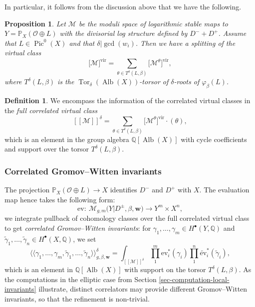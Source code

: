 \documentclass[11pt]{article}
\numberwithin{equation}{section}
\newcommand{\vir}[1]{\big[#1\big]^\mathrm{vir}}
\newcommand{\fvir}[2]{[\![ #1 ]\!]^{#2}}
\newcommand{\ev}{\mathrm{ev}}
\newcommand{\Pic}{\operatorname{Pic}}
\newcommand{\Alb}{\operatorname{Alb}}
\newcommand{\PP}{\mathbb{P}}
\newcommand{\QQ}{\mathbb{Q}}
\newcommand{\bfw}{ {\boldsymbol w} }
\newcommand{\M}{\mathcal{M}}
\renewcommand{\O}{\mathcal{O}}
\numberwithin{equation}{section}
\newtheorem{prop}[theo]{Proposition}
\theoremstyle{definition}
\newtheorem{defi}[theo]{Definition}
\begin{document}
In particular, it follows from the discussion above that we have the following.
\begin{prop}
 Let $\M$ be the moduli space of logarithmic stable maps to $Y=\PP_X(\mathcal O\oplus L)$ with the divisorial log structure defined by $D^- + D^+$. Assume that $L\in\Pic^0(X)$ and that $\delta|\gcd(w_i)$.
 Then we have a splitting of the virtual class
 \[ \vir{\M}=\sum_{\theta\in T^\delta(L,\beta)}\vir{\M^\theta},\]
 where $T^\delta(L,\beta)$ is the $\operatorname{Tor}_{\delta}(\Alb(X))$-torsor of $\delta$-roots of $\varphi_\beta(L)$.
\end{prop}

\begin{defi}\label{def:fullrefined}
We encompass the information of the correlated virtual classes in the \textit{full correlated virtual class}
\[ \fvir{\M}{\delta} = \sum_{\theta\in T^\delta(L,\beta)} \vir{\M^\theta}\cdot (\theta),\]
which is an element in the group algebra $\QQ[\Alb(X)]$ with cycle coefficients and support over the torsor $T^\delta(L,\beta)$.
\end{defi}

\subsubsection{Correlated Gromov--Witten invariants}
The projection $\PP_X(\O\oplus L)\to X$ identifies $D^-$ and $D^+$ with $X$. The evaluation map hence takes the following form:
\[
\ev\colon\ \M_{g,m}\bigl(Y|D^\pm,\beta,\bfw\bigr) \longrightarrow Y^m\times X^n,
 \]
we integrate pullback of cohomology classes over the full correlated virtual class to get \textit{correlated Gromov--Witten invariants}: for $\gamma_1,\dots,\gamma_m\in H^\bullet(Y,\QQ)$ and $\widetilde{\gamma}_1,\dots,\widetilde{\gamma}_n\in H^\bullet(X,\QQ)$, we set
\[ \bigl\langle\bigl\langle\gamma_1,\dots,\gamma_m,\widetilde{\gamma}_1,\dots,\widetilde{\gamma}_n\bigr\rangle\bigr\rangle^\delta_{g,\beta,\bfw} = \int_{\fvir{\M}{\delta}} \prod_1^m\ev_i^*(\gamma_i)\prod_1^n\widetilde{\ev}_i^*(\widetilde{\gamma}_i), \]
which is an element in $\QQ[\Alb(X)]$ with support on the torsor $T^\delta(L,\beta)$. As the computations in the elliptic case from Section \ref{sec-computation-local-invariants} illustrate, distinct correlators may provide different Gromov--Witten invariants, so that the refinement is non-trivial.
\end{document}
